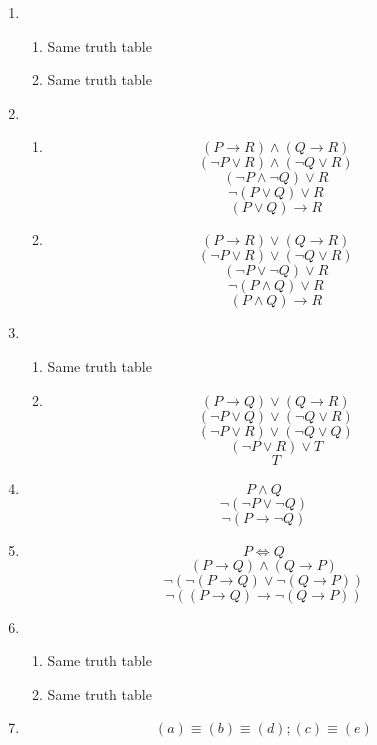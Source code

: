 \begin{enumerate}
\begin{enumerate}
    \end{enumerate}
    \item
    \begin{enumerate}
        \item Same truth table
        \item Same truth table
    \end{enumerate}
    \item
    \begin{enumerate}
        \item 
        \[(P \rightarrow R) \land (Q \rightarrow R)\]
        \[(\lnot P \lor R) \land (\lnot Q \lor R)\]
        \[(\lnot P \land \lnot Q) \lor R\]
        \[\lnot (P \lor Q) \lor R\]
        \[(P \lor Q) \rightarrow R\]
        \item 
        \[(P \rightarrow R) \lor (Q \rightarrow R)\]
        \[(\lnot P \lor R) \lor (\lnot Q \lor R)\]
        \[(\lnot P \lor \lnot Q) \lor R\]
        \[\lnot(P \land Q) \lor R\]
        \[(P \land Q) \rightarrow R\]
    \end{enumerate}
    \item
    \begin{enumerate}
        \item Same truth table
        \item
        \[(P \rightarrow Q) \lor (Q \rightarrow R)\]
        \[(\lnot P \lor Q) \lor (\lnot Q \lor R)\]
        \[(\lnot P \lor R) \lor (\lnot Q \lor Q)\]
        \[(\lnot P \lor R) \lor T\]
        \[T\]
    \end{enumerate}
    \item
    \[P \land Q\]
    \[\lnot(\lnot P \lor \lnot Q)\]
    \[\lnot (P \rightarrow \lnot Q)\]
    \item
    \[P \iff Q\]
    \[(P \rightarrow Q) \land (Q \rightarrow P)\]
    \[\lnot (\lnot (P \rightarrow Q) \lor  \lnot (Q \rightarrow P))\]
    \[\lnot ((P \rightarrow Q) \rightarrow  \lnot (Q \rightarrow P))\]
    \item
    \begin{enumerate}
        \item Same truth table
        \item Same truth table
    \end{enumerate}
    \item \[(a) \equiv (b) \equiv (d); (c) \equiv (e)\]
\end{enumerate}
